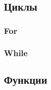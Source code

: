 \newpage
\subsection{Циклы}

\subsubsection{For}

\subsubsection{While}

\newpage
\subsection{Функции}

\newpage
